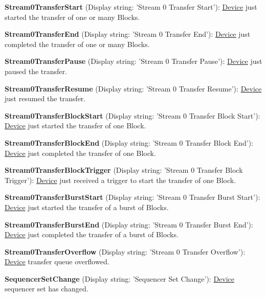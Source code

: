 \begin{DoxyItemize}
\item {\bfseries Stream0\+Transfer\+Start} (Display string\+: 'Stream 0 Transfer Start')\+: \hyperlink{classmv_i_m_p_a_c_t_1_1acquire_1_1_device}{Device} just started the transfer of one or many Blocks.
\item {\bfseries Stream0\+Transfer\+End} (Display string\+: 'Stream 0 Transfer End')\+: \hyperlink{classmv_i_m_p_a_c_t_1_1acquire_1_1_device}{Device} just completed the transfer of one or many Blocks.
\item {\bfseries Stream0\+Transfer\+Pause} (Display string\+: 'Stream 0 Transfer Pause')\+: \hyperlink{classmv_i_m_p_a_c_t_1_1acquire_1_1_device}{Device} just paused the transfer.
\item {\bfseries Stream0\+Transfer\+Resume} (Display string\+: 'Stream 0 Transfer Resume')\+: \hyperlink{classmv_i_m_p_a_c_t_1_1acquire_1_1_device}{Device} just resumed the transfer.
\item {\bfseries Stream0\+Transfer\+Block\+Start} (Display string\+: 'Stream 0 Transfer Block Start')\+: \hyperlink{classmv_i_m_p_a_c_t_1_1acquire_1_1_device}{Device} just started the transfer of one Block.
\item {\bfseries Stream0\+Transfer\+Block\+End} (Display string\+: 'Stream 0 Transfer Block End')\+: \hyperlink{classmv_i_m_p_a_c_t_1_1acquire_1_1_device}{Device} just completed the transfer of one Block.
\item {\bfseries Stream0\+Transfer\+Block\+Trigger} (Display string\+: 'Stream 0 Transfer Block Trigger')\+: \hyperlink{classmv_i_m_p_a_c_t_1_1acquire_1_1_device}{Device} just received a trigger to start the transfer of one Block.
\item {\bfseries Stream0\+Transfer\+Burst\+Start} (Display string\+: 'Stream 0 Transfer Burst Start')\+: \hyperlink{classmv_i_m_p_a_c_t_1_1acquire_1_1_device}{Device} just started the transfer of a burst of Blocks.
\item {\bfseries Stream0\+Transfer\+Burst\+End} (Display string\+: 'Stream 0 Transfer Burst End')\+: \hyperlink{classmv_i_m_p_a_c_t_1_1acquire_1_1_device}{Device} just completed the transfer of a burst of Blocks.
\item {\bfseries Stream0\+Transfer\+Overflow} (Display string\+: 'Stream 0 Transfer Overflow')\+: \hyperlink{classmv_i_m_p_a_c_t_1_1acquire_1_1_device}{Device} transfer queue overflowed.
\item {\bfseries Sequencer\+Set\+Change} (Display string\+: 'Sequencer Set Change')\+: \hyperlink{classmv_i_m_p_a_c_t_1_1acquire_1_1_device}{Device} sequencer set has changed.

\end{DoxyItemize}
